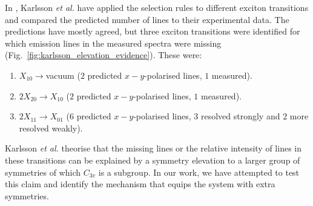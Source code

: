 In \cite{karlsson}, Karlsson \textit{et al.} have applied the selection rules to different exciton transitions and compared the predicted number of lines to their experimental data. The predictions have mostly agreed, but three exciton transitions were identified for which emission lines in the measured spectra were missing (Fig.~\ref{fig:karlsson_elevation_evidence}). These were:
\begin{enumerate}
\item $X_{10}\to $vacuum ($2$ predicted $x-y$-polarised lines, $1$ measured).
\item $2X_{20}\to X_{10}$ ($2$ predicted $x-y$-polarised lines, $1$ measured).
\item $2X_{11}\to X_{01}$ ($6$ predicted $x-y$-polarised lines, $3$ resolved strongly and $2$ more resolved weakly).
\end{enumerate}
Karlsson \textit{et al.} theorise that the missing lines or the relative intensity of lines in these transitions can be explained by a symmetry elevation to a larger group of symmetries of which $C_{3v}$ is a subgroup. In our work, we have attempted to test this claim and identify the mechanism that equips the system with extra symmetries.\\\hfill\\
